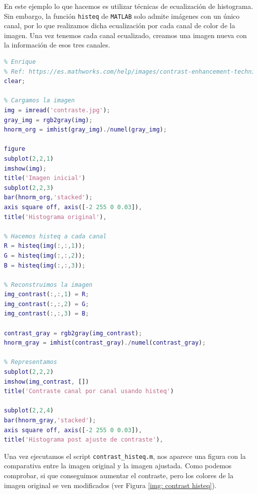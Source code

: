 \documentclass[12pt]{article}
\begin{document}
	\noindent En este ejemplo lo que hacemos es utilizar técnicas de ecualización de histograma. Sin embargo, la función \texttt{histeq} de \texttt{MATLAB} solo admite imágenes con un único canal, por lo que realizamos dicha ecualización por cada canal de color de la imagen. Una vez tenemos cada canal ecualizado, creamos una imagen nueva con la información de esos tres canales.
	
	\begin{lstlisting}[language=Matlab, caption={Implementación contraste utilizando \texttt{histeq} en \texttt{MATLAB}}]
% 2 - Contraste 
% Enrique
% Ref: https://es.mathworks.com/help/images/contrast-enhancement-techniques.html
clear;

% Cargamos la imagen
img = imread('contraste.jpg');
gray_img = rgb2gray(img);
hnorm_org = imhist(gray_img)./numel(gray_img);

figure
subplot(2,2,1)
imshow(img);
title('Imagen inicial')
subplot(2,2,3)
bar(hnorm_org,'stacked'); 
axis square off, axis([-2 255 0 0.03]), 
title('Histograma original'),

% Hacemos histeq a cada canal
R = histeq(img(:,:,1));
G = histeq(img(:,:,2));
B = histeq(img(:,:,3));

% Reconstruimos la imagen
img_contrast(:,:,1) = R;
img_contrast(:,:,2) = G;
img_contrast(:,:,3) = B;

contrast_gray = rgb2gray(img_contrast);
hnorm_gray = imhist(contrast_gray)./numel(contrast_gray);

% Representamos
subplot(2,2,2)
imshow(img_contrast, [])
title('Contraste canal por canal usando histeq')

subplot(2,2,4)
bar(hnorm_gray,'stacked'); 
axis square off, axis([-2 255 0 0.03]), 
title('Histograma post ajuste de contraste'), 
	\end{lstlisting}

	\noindent Una vez ejecutamos el script \texttt{contrast\_histeq.m}, nos aparece una figura con la comparativa entre la imagen original y la imagen ajustada. Como podemos comprobar, si que conseguimos aumentar el contraste, pero los colores de la imagen original se ven modificados (ver Figura \ref{img: contrast histeq}).
	
\end{document}
